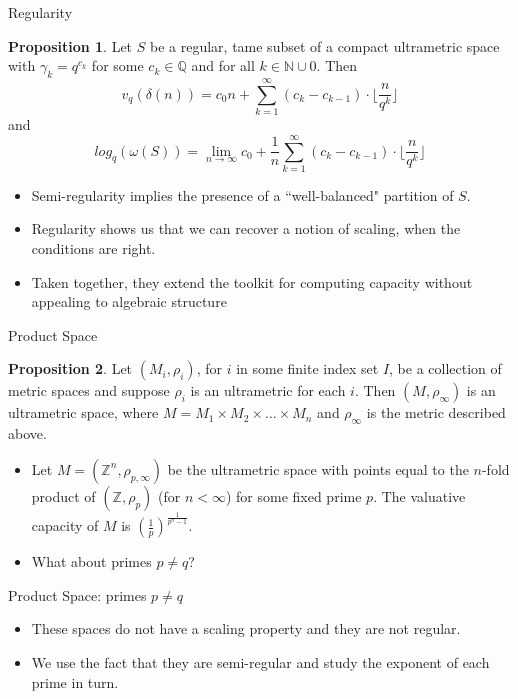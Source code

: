 \documentclass{beamer}
\theoremstyle{definition}
\newtheorem{proposition}{Proposition}
\begin{document}
\begin{frame}{Regularity}
\begin{proposition}
	Let $S$ be a regular, tame subset of a compact ultrametric space with $\gamma_k = q^{c_k}$ for some $c_k \in \mathbb{Q}$ and for all $k \in \mathbb{N} \cup 0$. Then 
	\[v_{q}(\delta(n)) =  c_0n + \sum_{k=1}^{\infty} (c_{k} - c_{k-1}) \cdot \lfloor\frac{n}{q^{k}}\rfloor \]
	and 
	\[log_q(\omega(S)) = \lim_{n\to\infty} c_0 + \frac{1}{n}\sum_{k=1}^{\infty} (c_{k} - c_{k-1}) \cdot \lfloor\frac{n}{q^{k}}\rfloor  \]
\end{proposition}
\end{frame}

\begin{frame}
	\begin{itemize}
		\item  Semi-regularity implies the presence of a ``well-balanced" partition of $S$.
		\pause
		\item Regularity shows us that we can recover a notion of scaling, when the conditions are right.
		\pause 
		\item Taken together, they extend the toolkit for computing capacity without appealing to algebraic structure\only<+->{!} 
	\end{itemize}
\end{frame}


\begin{frame}{Product Space}
\begin{proposition}
	Let $(M_i, \rho_i)$, for $i$ in some finite index set $I$, be a collection of metric spaces and suppose $\rho_i$ is an ultrametric for each $i$. Then $(M,\rho_\infty)$ is an ultrametric space, where $M=M_1 \times M_2 \times \ldots \times M_n$ and $\rho_\infty$ is the metric described above.
\end{proposition}
\pause
\begin{itemize}
	\item Let $M=(\mathbb{Z}^n, \rho_{p, \infty})$ be the ultrametric space with points equal to the $n$-fold product of $(\mathbb{Z}, \rho_p)$ (for $n < \infty$) for some fixed prime $p$. The valuative capacity of $M$ is  $(\frac{1}{p})^{\frac{1}{p^n-1}}$.
	\pause
	\item What about primes $p \neq q$?
\end{itemize}
\end{frame}

\begin{frame}{Product Space: primes $p \neq q$}
	\begin{itemize}
		\item These spaces do not have a scaling property and they are not regular.
		\pause
		\item We use the fact that they are semi-regular and study the exponent of each prime in turn.
	\end{itemize}
\end{frame}
\end{document}
